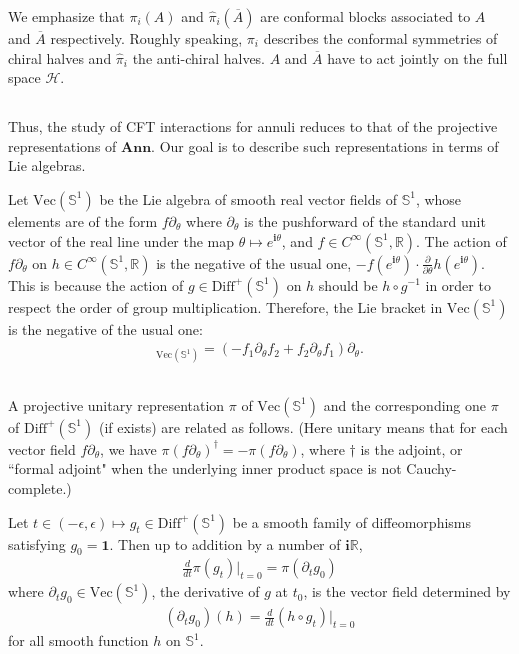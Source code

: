 \documentclass[12pt,a4paper,notitlepage]{article}
\theoremstyle{definition}
\theoremstyle{plain}
\newcommand{\mc}{\mathcal}
\newcommand{\wht}{\widehat}
\newcommand{\ovl}{\overline}
\newcommand{\id}{\mathbf{1}}
\newcommand{\Diffp}{\mathrm{Diff}^+}
\newcommand{\Vect}{\mathrm{Vec}}
\newcommand{\im}{\mathbf{i}}
\newcommand{\Rbb}{\mathbb R}
\newcommand{\Sbb}{{\mathbb S}}
\newcommand{\Ann}{\mathbf{Ann}}
\numberwithin{equation}{section}
\begin{document}
We emphasize that $\pi_i(A)$ and $\wht\pi_i(\ovl A)$ are conformal blocks associated to $A$ and $\ovl A$ respectively.  Roughly speaking, $\pi_i$ describes the conformal symmetries of chiral halves and $\wht\pi_i$ the anti-chiral halves. $A$ and $\ovl A$ have to act jointly on the full space $\mc H$.



\subsection{}

Thus, the study of CFT interactions for annuli reduces to that of the projective representations of $\Ann$. Our goal is to describe such representations in terms of Lie algebras. 

Let $\Vect(\Sbb^1)$ be the Lie algebra of smooth real vector fields of $\Sbb^1$, whose elements are of the form $f\partial_\theta$ where $\partial_\theta$ is the pushforward of the standard unit vector of the real line under the map $\theta\mapsto e^{\im\theta}$, and $f\in C^\infty(\Sbb^1,\Rbb)$. The action of  $f\partial_\theta$ on $h\in C^\infty(\Sbb^1,\Rbb)$ is the negative of the usual one, $-f(e^{\im\theta})\cdot \frac\partial{\partial\theta}h(e^{\im\theta})$. This is because the action of $g\in\Diffp(\Sbb^1)$ on $h$ should be $h\circ g^{-1}$ in order to respect the order of group multiplication. Therefore, the Lie bracket in $\Vect(\Sbb^1)$ is the negative of the usual one:
\begin{align}
[f_1\partial_\theta,f_2\partial_\theta]_{\Vect(\Sbb^1)}=(-f_1\partial_\theta f_2+f_2\partial_\theta f_1)\partial_\theta.	
\end{align}


\subsection{}\label{lb8}


A projective unitary representation $\pi$ of $\Vect(\Sbb^1)$ and the corresponding one $\pi$ of $\Diffp(\Sbb^1)$ (if exists) are related as follows. (Here unitary means that for each vector field $f\partial_\theta$, we have $\pi(f\partial_\theta)^\dagger=-\pi(f\partial_\theta)$, where $\dagger$ is the adjoint, or ``formal adjoint" when the underlying inner product space is not Cauchy-complete.) 

Let $t\in(-\epsilon,\epsilon)\mapsto g_t\in\Diffp(\Sbb^1)$ be a smooth family of diffeomorphisms satisfying $g_0=\id$. Then up to addition by a number of $\im\Rbb$, 
\begin{align}
\frac d{dt}\pi(g_t)\Big|_{t=0}=\pi(\partial_t g_0)	\label{eq5}
\end{align}
where $\partial_t g_0\in\Vect(\Sbb^1)$, the derivative of $g$ at $t_0$, is the vector field determined by
\begin{align}
(\partial_t g_0)(h)=\frac d{dt}(h\circ g_t)\Big|_{t=0}\label{eq4}
\end{align}
for all smooth function $h$ on $\Sbb^1$.
\end{document}

